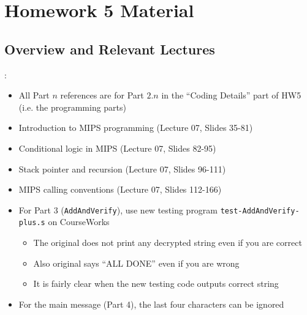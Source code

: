 \documentclass{../slides}
\begin{document}
\section{Homework 5 Material}
\subsection{Overview and Relevant Lectures}
\begin{frame}{\secname: \subsecname}
    \begin{itemize}
        \item All Part $n$ references are for Part $2.n$ in the \enquote{Coding Details} part of HW5 (i.e. the programming parts)
        \item Introduction to MIPS programming (Lecture 07, Slides 35-81)
        \item Conditional logic in MIPS (Lecture 07, Slides 82-95)
        \item Stack pointer and recursion (Lecture 07, Slides 96-111)
        \item MIPS calling conventions (Lecture 07, Slides 112-166)
        \item For Part 3 (\lstinline{AddAndVerify}), use new testing program \lstinline{test-AddAndVerify-plus.s} on CourseWorks
        \begin{itemize}
            \item The original does not print any decrypted string even if you are correct
            \item Also original says \enquote{ALL DONE} even if you are wrong
            \item It is fairly clear when the new testing code outputs correct string
        \end{itemize}
        \item For the main message (Part 4), the last four characters can be ignored
    \end{itemize}
\end{frame}
\end{document}
